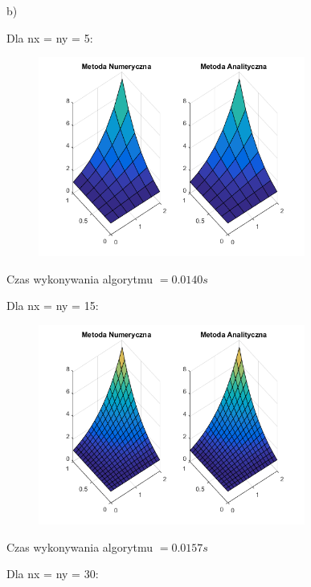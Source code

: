\newpage

b)

Dla nx = ny = 5:

\begin{figure}[!ht]
	\begin{center}
		\includegraphics[width=0.78\textwidth]{Lab5/charts/zad2/5x5.png}
	\end{center}
\end{figure}

Czas wykonywania algorytmu $ = 0.0140 s$

Dla nx = ny = 15:

\begin{figure}[!ht]
	\begin{center}
		\includegraphics[width=0.78\textwidth]{Lab5/charts/zad2/15x15.png}
	\end{center}
\end{figure}

Czas wykonywania algorytmu $ = 0.0157 s$

\newpage
Dla nx = ny = 30:

